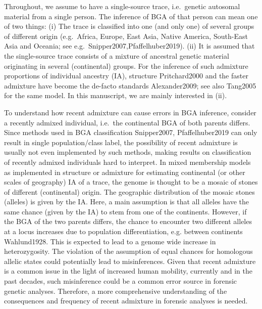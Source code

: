 \documentclass[12pt]{article}
\theoremstyle{definition}
\begin{document}
{\color{blue} Throughout, we assume to have a single-source trace, i.e.\ genetic autosomal material from a single person. The inference of BGA of that person can mean one of two things: (i)} The trace is classified into one {\color{blue} (and only one)} of several groups of different origin (e.g.\ Africa, Europe, East Asia, Native America, South-East Asia and Oceania; see e.g.\ \cite{article}{Snipper2007,Pfaffelhuber2019}). {\color{blue}(ii)} It is assumed that {\color{blue} the single-source trace} consists of a mixture of ancestral genetic material originating in several {\color{blue}(continental)} groups. For the inference of such admixture proportions of individual ancestry (IA), {\sc structure} \cite{article}{Pritchard2000} and the faster {\sc admixture} have become the de-facto standards \cite{article}{Alexander2009}; see also \cite{article}{Tang2005} for the same model. {\color{blue} In this manuscript, we are mainly interested in (ii).}

To understand how recent admixture can cause errors in BGA inference, consider a recently admixed individual, i.e.\ the continental BGA of both parents differs. Since methods used in BGA classification \cite{article}{Snipper2007, Pfaffelhuber2019} can only result in single population/class label, the possibility of recent admixture is usually not even implemented by such methods, making results on classification of recently admixed individuals hard to interpret. In mixed membership models as implemented in {\sc structure} or {\sc admixture} for estimating continental (or other scales of geography) IA of a trace, the genome is thought to be a mosaic of stones of different (continental) origin. The geographic distribution of the mosaic stones (alleles) is given by the IA. Here, a main assumption is that all alleles have the same chance (given by the IA) to stem from one of the continents. However, if the BGA of the two parents differs, the chance to encounter two different alleles at a locus increases due to population differentiation, e.g. between continents \cite{article}{Wahlund1928}. This is expected to lead to a genome wide increase in heterozygosity. The violation of the assumption of equal chances for homologous allelic states could potentially lead to misinferences. Given that recent admixture is a common issue in the light of increased human mobility, currently and in the past decades, such misinference could be a common error source in forensic genetic analyses. Therefore, a more comprehensive understanding of the consequences and frequency of recent admixture in forensic analyses is needed.
\end{document}
